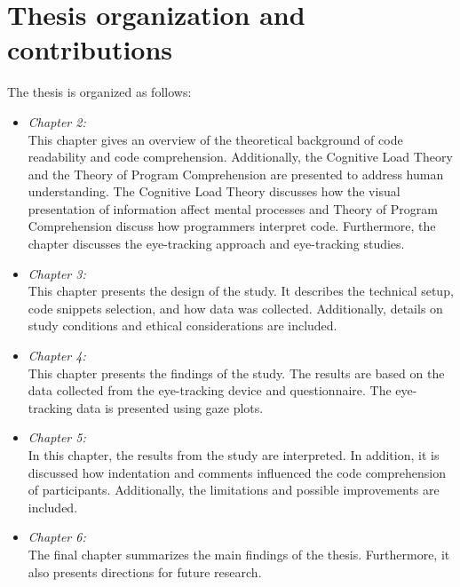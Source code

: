\section{Thesis organization and contributions}

The thesis is organized as follows:
\begin{itemize}

\item[] \emph{Chapter 2:} 
\\This chapter gives an overview of the theoretical background of code readability and code comprehension. Additionally, the Cognitive Load Theory and the Theory of Program Comprehension are presented to address human understanding. The Cognitive Load Theory discusses how the visual presentation of information  affect mental processes and Theory of Program Comprehension discuss how programmers interpret code. 
Furthermore, the chapter discusses the eye-tracking approach and eye-tracking studies.  


\item[] \emph{Chapter 3:}
\\This chapter presents the design of the study. It describes the technical setup, code snippets selection, and how data was collected. Additionally, details on study conditions and ethical considerations are included.


\item[] \emph{Chapter 4:} 
\\ This chapter presents the findings of the study. The results are based on the data collected from the eye-tracking device and questionnaire. The eye-tracking data is presented using gaze plots.


\item[] \emph{Chapter 5:} 
\\In this chapter, the results from the study are interpreted. In addition, it is discussed how indentation and comments influenced the code comprehension of participants. Additionally, the limitations and possible improvements are included.

\item[] \emph{Chapter 6:} 
\\The final chapter summarizes the main findings of the thesis. Furthermore, it also presents directions for future research.

\end{itemize}


